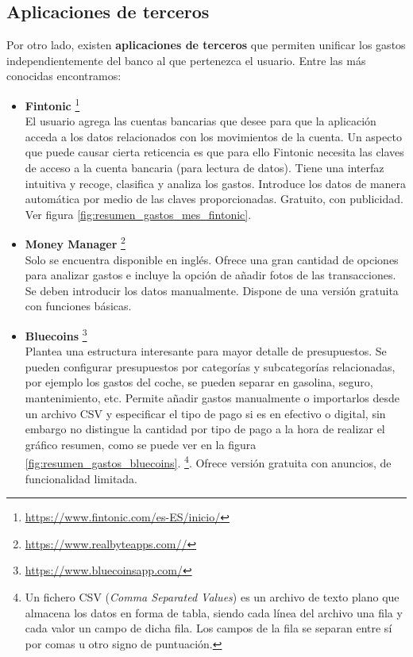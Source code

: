 \subsection{Aplicaciones de terceros}
Por otro lado, existen \textbf{aplicaciones de terceros} que permiten unificar los gastos 
independientemente del banco al que pertenezca el usuario. Entre las más conocidas 
encontramos:

\begin{itemize}
    \item \textbf{Fintonic} \footnote{\url{https://www.fintonic.com/es-ES/inicio/}} \\
    El usuario agrega las cuentas bancarias que desee para que la aplicación 
    acceda a los datos relacionados con los movimientos de la cuenta. 
    Un aspecto que puede causar cierta reticencia es que para ello Fintonic necesita
    las claves de acceso a la cuenta bancaria (para lectura de datos).
    Tiene una interfaz intuitiva y recoge, clasifica y analiza los gastos.
    Introduce los datos de manera automática por medio de las claves proporcionadas. 
    Gratuito, con publicidad. Ver figura \ref{fig:resumen_gastos_mes_fintonic}.

    \item \textbf{Money Manager}  \footnote{\url{https://www.realbyteapps.com//}} \\
    Solo se encuentra disponible en inglés. Ofrece una gran cantidad de opciones
    para analizar gastos e incluye la opción de añadir fotos de las transacciones. 
    Se deben introducir los datos manualmente. 
    Dispone de una versión gratuita con funciones básicas.

    \item \textbf{Bluecoins} \footnote{\url{https://www.bluecoinsapp.com/}} \\
    Plantea una estructura interesante para mayor detalle de presupuestos. 
    Se pueden configurar presupuestos por categorías y subcategorías relacionadas, por ejemplo 
    los gastos del coche, se pueden separar en gasolina, seguro, mantenimiento, etc. 
    Permite añadir gastos manualmente o importarlos desde un archivo CSV y especificar 
    el tipo de pago si es en efectivo o digital, sin embargo no distingue la cantidad 
    por tipo de pago a la hora de realizar el gráfico resumen, como se puede ver en la figura 
    \ref{fig:resumen_gastos_bluecoins}.
    \footnote{Un fichero CSV (\textit{Comma Separated Values}) es un archivo de texto plano 
    que almacena los datos en forma de tabla, siendo cada línea del archivo una fila y 
    cada valor un campo de dicha fila. Los campos de la fila se separan entre sí por comas 
    u otro signo de puntuación.}. 
    Ofrece versión gratuita con anuncios, de funcionalidad limitada.


\end{itemize}
